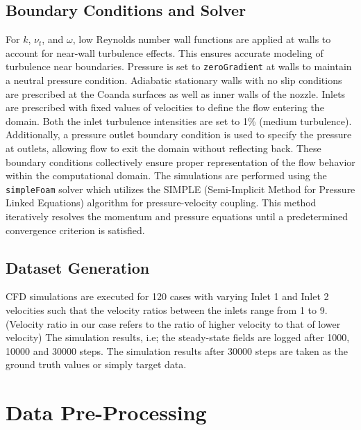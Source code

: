 \subsection{Boundary Conditions and Solver}
For \( k \), \( \nu_t \), and \( \omega \), low Reynolds number wall functions are applied at walls to account for near-wall turbulence effects. This ensures accurate modeling of turbulence near boundaries. Pressure is set to \verb|zeroGradient| at walls to maintain a neutral pressure condition. Adiabatic stationary walls with no slip conditions are prescribed at the Coanda surfaces as well as inner walls of the nozzle. Inlets are prescribed with fixed values of velocities to define the flow entering the domain. Both the inlet turbulence intensities are set to 1\% (medium turbulence). Additionally, a pressure outlet boundary condition is used to specify the pressure at outlets, allowing flow to exit the domain without reflecting back. These boundary conditions collectively ensure proper representation of the flow behavior within the computational domain. The simulations are performed using the \verb|simpleFoam| solver which utilizes the SIMPLE (Semi-Implicit Method for Pressure Linked Equations) algorithm for pressure-velocity coupling. This method iteratively resolves the momentum and pressure equations until a predetermined convergence criterion is satisfied. 
\subsection{Dataset Generation}
CFD simulations are executed for 120 cases with varying Inlet 1 and Inlet 2 velocities such that the velocity ratios between the inlets range from 1 to 9. (Velocity ratio in our case refers to the ratio of higher velocity to that of lower velocity) The simulation results, i.e; the steady-state fields are logged after 1000, 10000 and 30000 steps. The simulation results after 30000 steps are taken as the ground truth values or simply target data.
\section{Data Pre-Processing}
